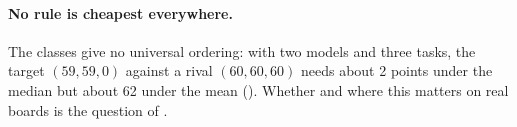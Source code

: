 \paragraph{No rule is cheapest everywhere.}
The classes give no universal ordering: with two models and three tasks, the target $(59,59,0)$ against a rival $(60,60,60)$ needs about 2 points under the median but about 62 under the mean (). Whether and where this matters on real boards is the question of .
